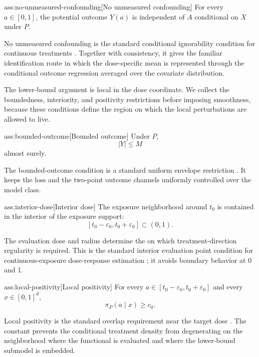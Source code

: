 \begin{assumptionv}{ass:no-unmeasured-confounding}[No unmeasured confounding]
For every \(a\in[0,1]\), the potential outcome \(Y(a)\) is independent of \(A\) conditional on \(X\) under \(P\).
\end{assumptionv}

No unmeasured confounding is the standard conditional ignorability condition for continuous treatments \citep{kennedy2017}. Together with consistency, it gives the familiar identification route in which the dose-specific mean is represented through the conditional outcome regression averaged over the covariate distribution.

The lower-bound argument is local in the dose coordinate. We collect the boundedness, interiority, and positivity restrictions before imposing smoothness, because these conditions define the region on which the local perturbations are allowed to live.

\begin{assumptionv}{ass:bounded-outcome}[Bounded outcome]
Under \(P\),
\[
|Y|\le M
\]
almost surely.
\end{assumptionv}

The bounded-outcome condition is a standard uniform envelope restriction \citep{bonvini2022}. It keeps the loss and the two-point outcome channels uniformly controlled over the model class.

\begin{assumptionv}{ass:interior-dose}[Interior dose]
The exposure neighborhood around \(t_0\) is contained in the interior of the exposure support:
\[
[t_0-\varepsilon_0,t_0+\varepsilon_0]\subset(0,1).
\]
\end{assumptionv}

The evaluation dose  and radius  determine the  on which treatment-direction regularity is required. This is the standard interior evaluation point condition for continuous-exposure dose-response estimation \citep{colangelo2020}; it avoids boundary behavior at 0 and 1.

\begin{assumptionv}{ass:local-positivity}[Local positivity]
For every \(a\in[t_0-\varepsilon_0,t_0+\varepsilon_0]\) and every \(x\in[0,1]^d\),
\[
\pi_P(a\mid x)\ge c_0.
\]
\end{assumptionv}

Local positivity is the standard overlap requirement near the target dose \citep{bonvini2022}. The constant  prevents the conditional treatment density from degenerating on the neighborhood where the functional is evaluated and where the lower-bound submodel is embedded.

